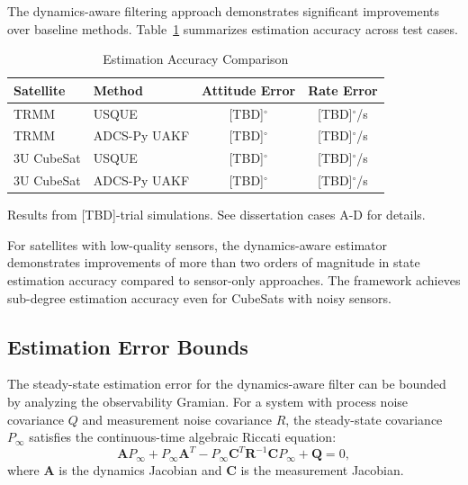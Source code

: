 \documentclass[conference]{IEEEtran}
\begin{document}
The dynamics-aware filtering approach demonstrates significant improvements over baseline methods. Table~\ref{tab:estimation_results} summarizes estimation accuracy across test cases.

\begin{table}[t]
    \centering
    \caption{Estimation Accuracy Comparison}
    \label{tab:estimation_results}
    \begin{tabular}{llcc}
        \toprule
        Satellite & Method & Attitude Error & Rate Error \\
        \midrule
        TRMM & USQUE & [TBD]$^\circ$ & [TBD]$^\circ$/s \\
        TRMM & ADCS-Py UAKF & [TBD]$^\circ$ & [TBD]$^\circ$/s \\
        \midrule
        3U CubeSat & USQUE & [TBD]$^\circ$ & [TBD]$^\circ$/s \\
        3U CubeSat & ADCS-Py UAKF & [TBD]$^\circ$ & [TBD]$^\circ$/s \\
        \bottomrule
    \end{tabular}
    \begin{flushleft}
    \small Results from [TBD]-trial simulations. See dissertation cases A-D for details.
    \end{flushleft}
\end{table}

For satellites with low-quality sensors, the dynamics-aware estimator demonstrates improvements of more than two orders of magnitude in state estimation accuracy compared to sensor-only approaches. The framework achieves sub-degree estimation accuracy even for CubeSats with noisy sensors.

\subsection{Estimation Error Bounds}\label{subsec:error_bounds}

The steady-state estimation error for the dynamics-aware filter can be bounded by analyzing the observability Gramian. For a system with process noise covariance $Q$ and measurement noise covariance $R$, the steady-state covariance $P_\infty$ satisfies the continuous-time algebraic Riccati equation:
\begin{equation}
\mathbf{A}P_\infty + P_\infty\mathbf{A}^T - P_\infty\mathbf{C}^T\mathbf{R}^{-1}\mathbf{C}P_\infty + \mathbf{Q} = 0,
\end{equation}
where $\mathbf{A}$ is the dynamics Jacobian and $\mathbf{C}$ is the measurement Jacobian.
\end{document}
